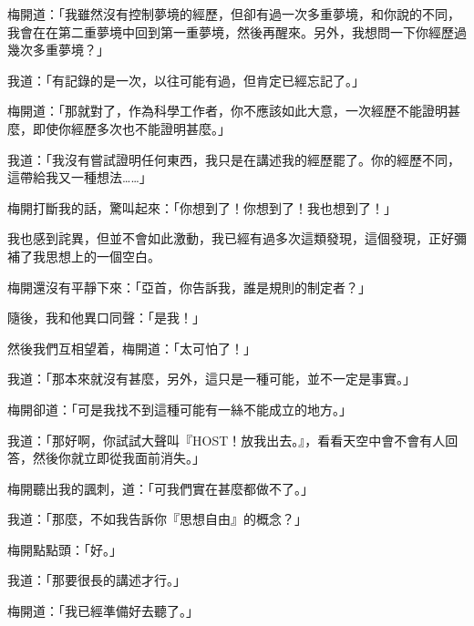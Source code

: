 梅開道：「我雖然沒有控制夢境的經歷，但卻有過一次多重夢境，和你說的不同，我會在在第二重夢境中回到第一重夢境，然後再醒來。另外，我想問一下你經歷過幾次多重夢境？」

我道：「有記錄的是一次，以往可能有過，但肯定已經忘記了。」

梅開道：「那就對了，作為科學工作者，你不應該如此大意，一次經歷不能證明甚麼，即使你經歷多次也不能證明甚麼。」

我道：「我沒有嘗試證明任何東西，我只是在講述我的經歷罷了。你的經歷不同，這帶給我又一種想法……」

梅開打斷我的話，驚叫起來：「你想到了！你想到了！我也想到了！」

我也感到詫異，但並不會如此激動，我已經有過多次這類發現，這個發現，正好彌補了我思想上的一個空白。

梅開還沒有平靜下來：「亞首，你告訴我，誰是規則的制定者？」

隨後，我和他異口同聲：「是我！」

然後我們互相望着，梅開道：「太可怕了！」

我道：「那本來就沒有甚麼，另外，這只是一種可能，並不一定是事實。」

梅開卻道：「可是我找不到這種可能有一絲不能成立的地方。」

我道：「那好啊，你試試大聲叫『HOST！放我出去。』，看看天空中會不會有人回答，然後你就立即從我面前消失。」

梅開聽出我的諷刺，道：「可我們實在甚麼都做不了。」

我道：「那麼，不如我告訴你『思想自由』的概念？」

梅開點點頭：「好。」

我道：「那要很長的講述才行。」

梅開道：「我已經準備好去聽了。」
